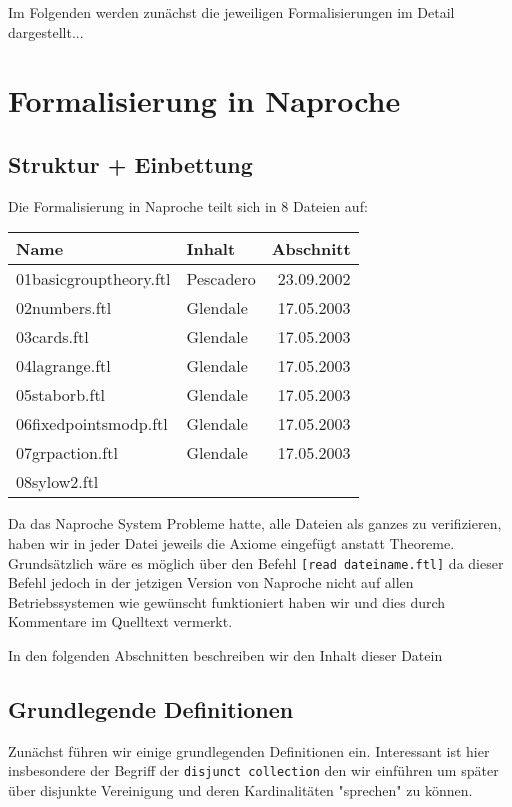 \documentclass[a4paper,12pt]{scrartcl}
\def\lstlanguagefiles{lstlean.tex}
\begin{document}
Im Folgenden werden zunächst die jeweiligen Formalisierungen im Detail dargestellt...
 

\section{Formalisierung in Naproche}
\def\lstlanguagefiles{lstftl.tex, lstlean.tex}
\subsection{Struktur + Einbettung}
Die Formalisierung in Naproche teilt sich in 8 Dateien auf:

\begin{tabularx}{\textwidth}{p{}|X|r}
	Name & Inhalt & Abschnitt\\
	\hline
	01basicgrouptheory.ftl 		& Pescadero		& 23.09.2002\\
	\hline
	02numbers.ftl			& Glendale		& 17.05.2003\\
	\hline
	03cards.ftl			& Glendale		& 17.05.2003\\
	\hline
	04lagrange.ftl 		& Glendale		& 17.05.2003\\
	\hline
	05staborb.ftl		& Glendale		& 17.05.2003\\
	\hline
	06fixedpointsmodp.ftl		& Glendale		& 17.05.2003\\
	\hline
	07grpaction.ftl 	& Glendale		& 17.05.2003\\
	\hline
	08sylow2.ftl &  & \\

\end{tabularx}

Da das Naproche System Probleme hatte, alle Dateien als ganzes zu verifizieren, haben wir in jeder Datei jeweils die
Axiome eingefügt anstatt Theoreme.
Grundsätzlich wäre es möglich über den Befehl \verb![read dateiname.ftl]! da dieser Befehl jedoch in der jetzigen Version von Naproche nicht auf allen Betriebssystemen wie gewünscht funktioniert haben wir und dies durch Kommentare im Quelltext vermerkt.

In den folgenden Abschnitten beschreiben wir den Inhalt dieser Datein

\subsection{Grundlegende Definitionen}

Zunächst führen wir einige grundlegenden Definitionen ein.
Interessant ist hier insbesondere der Begriff der \verb!disjunct collection! den wir einführen um später über disjunkte Vereinigung und deren Kardinalitäten "sprechen" zu können.
\end{document}
